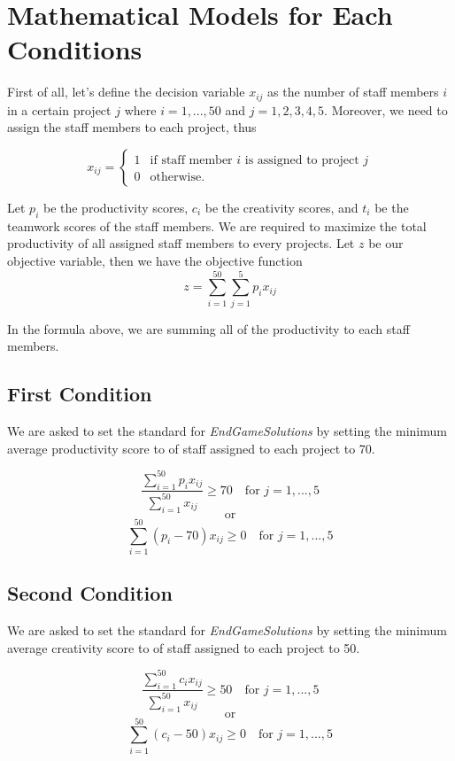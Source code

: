 \documentclass{article}
\begin{document}
\section{Mathematical Models for Each Conditions}
First of all, let's define the decision variable $x_{ij}$ as the number of staff members $i$ in a certain project $j$ where $i = 1,...,50$ and $j = 1,2,3,4,5$. Moreover, we need to assign the staff members to each project, thus

\[
x_{ij} =
\begin{cases}
    1 & \text{if staff member $i$ is assigned to project $j$}\\
    0 & \text{otherwise.}
\end{cases}
\]

Let $p_i$ be the productivity scores, $c_i$ be the creativity scores, and $t_i$ be the teamwork scores of the staff members. We are required to maximize the total productivity of all assigned staff members to every projects. Let $z$ be our objective variable, then we have the objective function\\

\[ z = \sum_{i=1}^{50}\sum_{j=1}^{5} p_ix_{ij} \]

In the formula above, we are summing all of the productivity to each staff members.

\subsection{First Condition}
We are asked to set the standard for \textit{EndGameSolutions} by setting the minimum average productivity score to of staff assigned to each project to 70.

\[\frac{\sum_{i=1}^{50} p_ix_{ij}}{\sum_{i=1}^{50}x_{ij}} \ge 70 \hspace{1em}\text{for $j=1,...,5$}\]
\[\text{or}\]
\[\sum_{i=1}^{50} (p_i-70)x_{ij} \ge 0 \hspace{1em}\text{for $j=1,...,5$}\]

\subsection{Second Condition}
We are asked to set the standard for \textit{EndGameSolutions} by setting the minimum average creativity score to of staff assigned to each project to 50.

\[\frac{\sum_{i=1}^{50} c_ix_{ij}}{\sum_{i=1}^{50}x_{ij}} \ge 50 \hspace{1em}\text{for $j=1,...,5$}\]
\[\text{or}\]
\[\sum_{i=1}^{50} (c_i-50)x_{ij} \ge 0 \hspace{1em}\text{for $j=1,...,5$}\]
\end{document}
